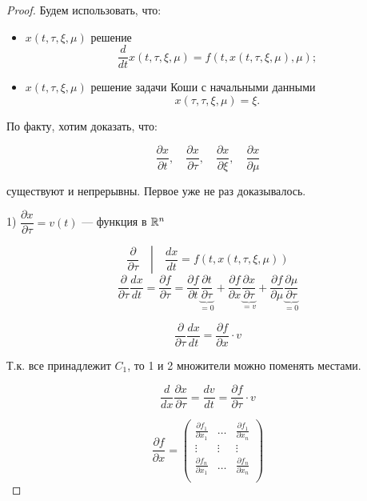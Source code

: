 \begin{proof}
  Будем использовать, что:
  \begin{itemize}
    \item $x(t, \tau, \xi, \mu)$ решение \\ $$\frac{d}{dt}x(t, \tau, \xi, \mu)
    = f(t, x(t, \tau, \xi, \mu), \mu);$$
    \item $x(t, \tau, \xi, \mu)$ решение задачи Коши с начальными данными
    \\$$x(\tau, \tau, \xi, \mu) = \xi.$$
  \end{itemize}

  По факту, хотим доказать, что:

  $$\frac{\partial x}{\partial t},\quad \frac{\partial x}{\partial \tau},
  \quad \frac{\partial x}{\partial \xi},\quad \frac{\partial x}{\partial \mu}$$
  
  существуют и непрерывны. Первое уже не раз доказывалось.

  1) $\dfrac{\partial x}{\partial \tau} = v(t)$ --- функция в $\mathbb{R}^n$

  $$\left. \frac{\partial}{\partial \tau}\quad \right|\quad \frac{dx}{dt} = f(t, x(t, \tau, \xi, \mu))$$
  $$\frac{\partial}{\partial \tau} \frac{dx}{dt} =
  \frac{\partial f}{\partial \tau} =
  \frac{\partial f}{\partial t} \underbrace{\frac{\partial t}{\partial \tau}}_{= 0}+
  \frac{\partial f}{\partial x} \underbrace{\frac{\partial x}{\partial \tau}}_{= v} +
  \frac{\partial f}{\partial \mu} \underbrace{\frac{\partial \mu}{\partial \tau}}_{= 0}$$

  $$\frac{\partial}{\partial \tau} \frac{dx}{dt} = \frac{\partial f}{\partial x}\cdot v$$

  Т.к. все принадлежит $C_1$, то 1 и 2 множители можно поменять местами.

  \begin{equation}
    \label{eq:1}
    \frac{d}{dx} \frac{\partial x}{\partial \tau} = \frac{dv}{dt}
    = \frac{\partial f}{\partial \tau}\cdot v
  \end{equation}

  $$\frac{\partial f}{\partial x} = 
  \begin{pmatrix}
    \frac{\partial f_1}{\partial x_1} & \dots  & \frac{\partial f_1}{\partial x_n} \\
    \vdots                            & \vdots & \vdots                            \\
    \frac{\partial f_n}{\partial x_1} & \dots  & \frac{\partial f_n}{\partial x_n} \\
  \end{pmatrix}
  $$


\end{proof}
